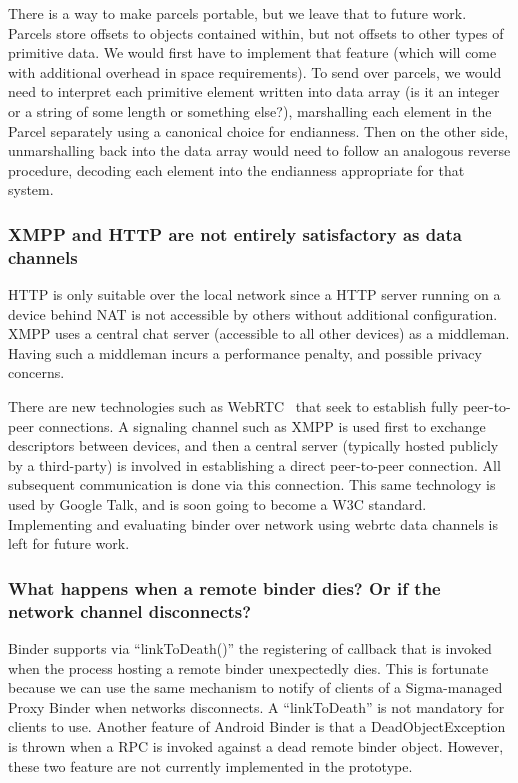\documentclass[prodmode]{acmlarge}
\begin{document}
There is a way to make parcels portable, but we leave that to future work. Parcels store offsets to objects contained within, but not offsets to other types of primitive data. We would first have to implement that feature (which will come with additional overhead in space requirements). To send over parcels, we would need to interpret each primitive element written into data array (is it an integer or a string of some length or something else?), marshalling each element in the Parcel separately using a canonical choice for endianness. Then on the other side, unmarshalling back into the data array would need to follow an analogous reverse procedure, decoding each element into the endianness appropriate for that system.

\subsubsection{XMPP and HTTP are not entirely satisfactory as data channels}
HTTP is only suitable over the local network since a HTTP server running on a device behind NAT is not accessible by others without additional configuration. XMPP uses a central chat server (accessible to all other devices) as a middleman. Having such a middleman incurs a performance penalty, and possible privacy concerns.

There are new technologies such as WebRTC~\cite{GoogleTalkLibrary} that seek to establish fully peer-to-peer connections. A signaling channel such as XMPP is used first to exchange descriptors between devices, and then a central server (typically hosted publicly by a third-party) is involved in establishing a direct peer-to-peer connection. All subsequent communication is done via this connection. This same technology is used by Google Talk, and is soon going to become a W3C standard. Implementing and evaluating binder over network using webrtc data channels is left for future work.

\subsubsection{What happens when a remote binder dies? Or if the network channel disconnects?}
Binder supports via ``linkToDeath()'' the registering of callback that is invoked when the process hosting a remote binder unexpectedly dies. This is fortunate because we can use the same mechanism to notify of clients of a Sigma-managed Proxy Binder when networks disconnects. A ``linkToDeath'' is not mandatory for clients to use. Another feature of Android Binder is that a DeadObjectException is thrown when a RPC is invoked against a dead remote binder object. However, these two feature are not currently implemented in the prototype.
\end{document}
